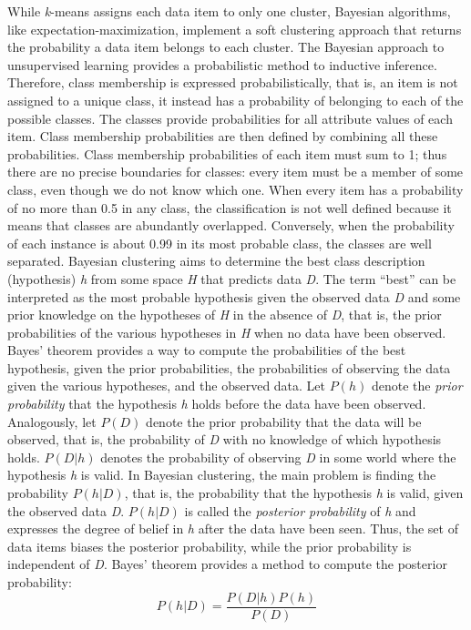 While \textit{k}-means assigns each data item to only one cluster, Bayesian algorithms, like expectation-maximization, implement a soft clustering approach that returns the probability a data item belongs to each cluster. The Bayesian approach to unsupervised learning provides a probabilistic method to inductive inference. Therefore, class membership is expressed probabilistically, that is, an item is not assigned to a unique class, it instead has a probability of belonging to each of the possible classes. The classes provide probabilities for all attribute values of each item. Class membership probabilities are then defined by combining all these probabilities. Class membership probabilities of each item must sum to 1; thus there are no precise boundaries for classes: every item must be a member of some class, even though we do not know which one. When every item has a probability of no more than 0.5 in any class, the classification is not well defined because it means that classes are abundantly overlapped. Conversely, when the probability of each instance is about 0.99 in its most probable class, the classes are well separated. Bayesian clustering aims to determine the best class description (hypothesis) \textit{h} from some space \textit{H} that predicts data \textit{D}. The term ``best'' can be interpreted as the most probable hypothesis given the observed data \textit{D} and some prior knowledge on the hypotheses of \textit{H} in the absence of \textit{D}, that is, the prior probabilities of the various hypotheses in \textit{H} when no data have been observed. Bayes' theorem provides a way to compute the probabilities of the best hypothesis, given the prior probabilities, the probabilities of observing the data given the various hypotheses, and the observed data. Let $P(h)$ denote the \textit{prior probability} that the hypothesis \textit{h} holds before the data have been observed. Analogously, let $P(D)$ denote the prior probability that the data will be observed, that is, the probability of \textit{D} with no knowledge of which hypothesis holds. $P(D|h)$ denotes the probability of observing \textit{D} in some world where the hypothesis \textit{h} is valid. In Bayesian clustering, the main problem is finding the probability $P(h|D)$, that is, the probability that the hypothesis \textit{h} is valid, given the observed data \textit{D}. $P(h|D)$ is called the \textit{posterior probability} of \textit{h} and expresses the degree of belief in \textit{h} after the data have been seen. Thus, the set of data items biases the posterior probability, while the prior probability is independent of \textit{D}. Bayes' theorem provides a method to compute the posterior probability:
\begin{equation*}
P(h|D)=\frac{P(D|h)P(h)}{P(D)}
\end{equation*}

